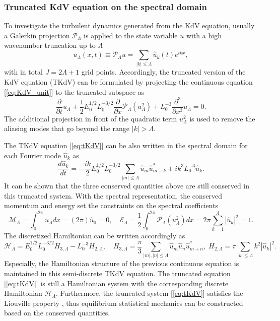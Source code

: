 \documentclass[9pt,twoside,lineno]{pnas-new}
\theoremstyle{plain}
\theoremstyle{plain}
\begin{document}
\subsubsection*{Truncated KdV equation on the spectral domain}

To investigate the turbulent dynamics generated from the KdV equation,
usually a Galerkin projection $\mathcal{P}_{\Lambda}$ is applied
to the state variable $u$ with a high wavenumber truncation up to
$\Lambda$
\begin{equation}
u_{\Lambda}\left(x,t\right)\equiv\mathcal{P}_{\Lambda}u=\sum_{\left|k\right|\leq\Lambda}\hat{u}_{k}\left(t\right)e^{ikx},\label{eq:trunc_u}
\end{equation}
with in total $J=2\Lambda+1$ grid points. Accordingly,
the truncated version of the KdV equation (TKdV) can be formulated
by projecting the continuous equation [\ref{eq:KdV_unit}] to the
truncated subspace as
\begin{equation}
\frac{\partial}{\partial t}u_{\Lambda}+\frac{1}{2}E_{0}^{1/2}L_{0}^{-3/2}\frac{\partial}{\partial x}\mathcal{P}_{\Lambda}\left(u_{\Lambda}^{2}\right)+L_{0}^{-3}\frac{\partial^{3}}{\partial x^{3}}u_{\Lambda}=0.\label{eq:tKdV}
\end{equation}
The additional projection in front of the quadratic term $u_{\Lambda}^{2}$
is used to remove the aliasing modes that go beyond the range $\left|k\right|>\Lambda$.

The TKdV equation [\ref{eq:tKdV}] can be also written in the spectral
domain for each Fourier mode $\hat{u}_{k}$ as
\[
\frac{d\hat{u}_{k}}{dt}=-\frac{ik}{2}E_{0}^{1/2}L_{0}^{-3/2}\sum_{\left|m\right|\leq\Lambda}\hat{u}_{m}\hat{u}_{m-k}^{*}+ik^{3}L_{0}^{-3}\hat{u}_{k}.
\]
It can be shown that the three conserved quantities above are still
conserved in this truncated system. With the spectral representation,
the conserved momentum and energy set the constraints on the spectral
coefficients 
\[
\mathcal{M}_{\Lambda}=\int_{0}^{2\pi}u_{\Lambda}dx=\left(2\pi\right)\hat{u}_{0}=0,\quad\mathcal{E}_{\Lambda}=\frac{1}{2}\int_{0}^{2\pi}\mathcal{P}_{\Lambda}\left(u_{\Lambda}^{2}\right)dx=2\pi\sum_{k=1}^{\Lambda}\left|\hat{u}_{k}\right|^{2}=1.
\]
The discretized Hamiltonian can be written accordingly as
\[
\mathcal{H}_{\Lambda}=E_{0}^{1/2}L_{0}^{-3/2}H_{3,\Lambda}-L_{0}^{-3}H_{2,\Lambda},\quad H_{3,\Lambda}=\frac{\pi}{3}\sum_{\left|m\right|,\left|n\right|\leq\Lambda}\hat{u}_{m}\hat{u}_{n}\hat{u}_{m+n}^{*},\;H_{2,\Lambda}=\pi\sum_{\left|k\right|\leq\Lambda}k^{2}\left|\hat{u}_{k}\right|^{2}.
\]
Especially, the Hamiltonian structure of the previous continuous equation
is maintained in this semi-discrete TKdV equation. The truncated equation
[\ref{eq:tKdV}] is still a Hamiltonian system with the corresponding
discrete Hamiltonian $\mathcal{H}_{\Lambda}$. Furthermore, the truncated
system [\ref{eq:tKdV}] satisfies the Liouville property \cite{abramov2003hamiltonian,majda2006nonlinear},
thus equilibrium statistical mechanics can be constructed based on
the conserved quantities.
\end{document}

